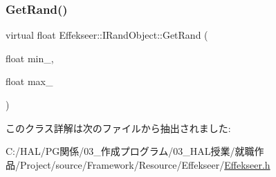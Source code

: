 \mbox{\label{class_effekseer_1_1_i_rand_object_a2c7b39779f597094973517df4afa0b48}} 
\subsubsection{\texorpdfstring{Get\+Rand()}{GetRand()}\hspace{0.1cm}{\footnotesize\ttfamily [2/2]}}
{\footnotesize\ttfamily virtual float Effekseer\+::\+I\+Rand\+Object\+::\+Get\+Rand (\begin{DoxyParamCaption}\item[{float}]{min\+\_\+,  }\item[{float}]{max\+\_\+ }\end{DoxyParamCaption})\hspace{0.3cm}{\ttfamily [pure virtual]}}



このクラス詳解は次のファイルから抽出されました\+:\begin{DoxyCompactItemize}
\item 
C\+:/\+H\+A\+L/\+P\+G関係/03\+\_\+作成プログラム/03\+\_\+\+H\+A\+L授業/就職作品/\+Project/source/\+Framework/\+Resource/\+Effekseer/\mbox{\hyperlink{_effekseer_8h}{Effekseer.\+h}}\end{DoxyCompactItemize}
